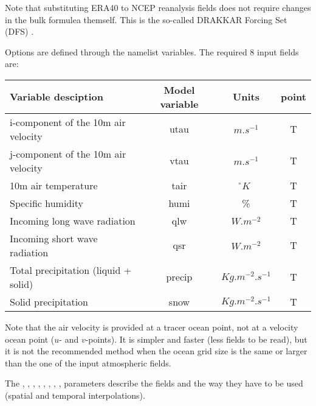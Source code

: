 \documentclass[../main/NEMO_manual]{subfiles}
\begin{document}
Note that substituting ERA40 to NCEP reanalysis fields does not require changes in the bulk formulea themself.
This is the so-called DRAKKAR Forcing Set (DFS) \citep{Brodeau_al_OM09}.

Options are defined through the   namelist variables.
The required 8 input fields are:

\begin{table}[htbp]
  \label{tab:CORE}
  \begin{center}
    \begin{tabular}{|l|c|c|c|}
      \hline
      Variable desciption					& Model variable	& Units	 & point \\		\hline
      i-component of the 10m air velocity	& utau		& $m.s^{-1}$			& T  \\ 	\hline
      j-component of the 10m air velocity	& vtau		& $m.s^{-1}$			& T  \\	\hline
      10m air temperature					& tair		& \r{}$K$				& T 	\\	\hline
      Specific humidity					& humi		& \%					& T \\		\hline
      Incoming long wave radiation		& qlw		& $W.m^{-2}$			& T \\		\hline
      Incoming short wave radiation		& qsr		& $W.m^{-2}$			& T \\		\hline
      Total precipitation (liquid + solid)	& precip	& $Kg.m^{-2}.s^{-1}$	& T \\ 	\hline
      Solid precipitation					& snow		& $Kg.m^{-2}.s^{-1}$	& T \\	\hline
    \end{tabular}
  \end{center}
\end{table}

Note that the air velocity is provided at a tracer ocean point, not at a velocity ocean point ($u$- and $v$-points).
It is simpler and faster (less fields to be read), but it is not the recommended method when
the ocean grid size is the same or larger than the one of the input atmospheric fields.

The , , , , , , ,
,  parameters describe the fields and the way they have to be used
(spatial and temporal interpolations). 
\end{document}
